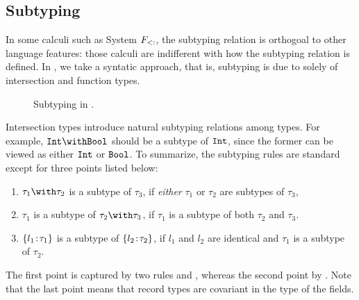 \subsection{Subtyping}




In some calculi such as System $ F_{<:} $, the subtyping relation is
orthogoal to other language features: those calculi are indifferent with how the
subtyping relation is defined. In \name, we take a syntatic approach, that is,
subtyping is due to solely of intersection and function types.

\begin{figure}

\caption{Subtyping in \name.}
\end{figure}


Intersection types introduce natural subtyping relations among types. For
example, $ \Int \andop \Bool $ should be a subtype of $ \texttt{Int} $, since the
former can be viewed as either $ \texttt{Int} $ or $ \texttt{Bool} $. To summarize, the
subtyping rules are standard except for three points listed below:
\begin{enumerate}
\item $ \tau_1 \andop \tau_2 $ is a subtype of $ \tau_3 $, if \emph{either} $ \tau_1 $ or
  $ \tau_2 $ are subtypes of $ \tau_3 $,

\item $ \tau_1 $ is a subtype of $ \tau_2 \andop \tau_3 $, if $ \tau_1 $ is a subtype of
  both $ \tau_2 $ and $ \tau_3 $.

\item $ \{ l_1 \!:\! \tau_1 \} $ is a subtype of $ \{ l_2 \!:\! \tau_2 \} $, if
  $ l_1 $ and $ l_2 $ are identical and $ \tau_1 $ is a subtype of $ \tau_2 $.
\end{enumerate}
The first point is captured by two rules  and
, whereas the second point by . Note that the
last point means that record types are covariant in the type of the fields.

